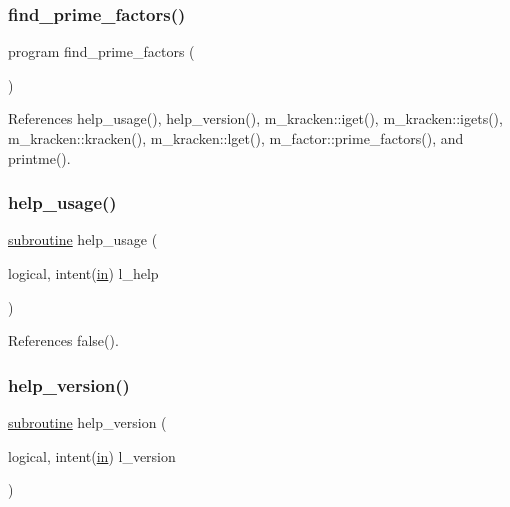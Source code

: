 \subsubsection{\texorpdfstring{find\+\_\+prime\+\_\+factors()}{find\_prime\_factors()}}
{\footnotesize\ttfamily program find\+\_\+prime\+\_\+factors (\begin{DoxyParamCaption}{ }\end{DoxyParamCaption})}



References help\+\_\+usage(), help\+\_\+version(), m\+\_\+kracken\+::iget(), m\+\_\+kracken\+::igets(), m\+\_\+kracken\+::kracken(), m\+\_\+kracken\+::lget(), m\+\_\+factor\+::prime\+\_\+factors(), and printme().

\mbox{\label{factors_8f90_a3e09a3b52ee8fb04eeb93fe5761626a8}} 
\subsubsection{\texorpdfstring{help\+\_\+usage()}{help\_usage()}}
{\footnotesize\ttfamily \hyperlink{M__stopwatch_83_8txt_acfbcff50169d691ff02d4a123ed70482}{subroutine} help\+\_\+usage (\begin{DoxyParamCaption}\item[{logical, intent(\hyperlink{M__journal_83_8txt_afce72651d1eed785a2132bee863b2f38}{in})}]{l\+\_\+help }\end{DoxyParamCaption})}



References false().

\mbox{\label{factors_8f90_a39c21619b08a3c22f19e2306efd7f766}} 
\subsubsection{\texorpdfstring{help\+\_\+version()}{help\_version()}}
{\footnotesize\ttfamily \hyperlink{M__stopwatch_83_8txt_acfbcff50169d691ff02d4a123ed70482}{subroutine} help\+\_\+version (\begin{DoxyParamCaption}\item[{logical, intent(\hyperlink{M__journal_83_8txt_afce72651d1eed785a2132bee863b2f38}{in})}]{l\+\_\+version }\end{DoxyParamCaption})}



